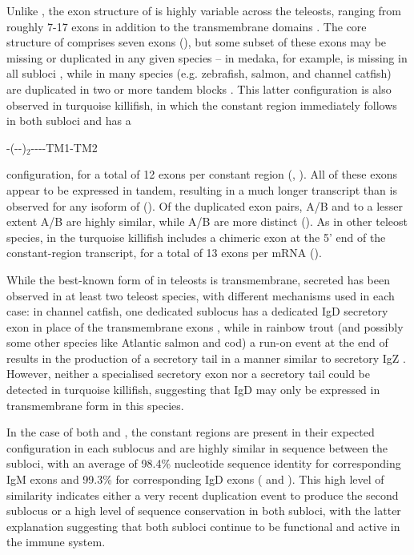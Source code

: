 		Unlike , the exon structure of  is highly variable across the teleosts, ranging from roughly 7-17 \cd{} exons in addition to the transmembrane domains \parencite{fillatreau2013astonishing}. The core structure of  comprises seven \cd{} exons (), but some subset of these exons may be missing or duplicated in any given species -- in medaka, for example,  is missing in all subloci \parencite{magadan2011medaka}, while in many species (e.g. zebrafish, salmon, and channel catfish)  are duplicated in two or more tandem blocks \parencite{fillatreau2013astonishing}. This latter configuration is also observed in turquoise killifish, in which the  constant region immediately follows  in both subloci and has a 

-(--)$_2$----TM1-TM2 

	\noindent configuration, for a total of 12 exons per  constant region (, ). All of these exons appear to be expressed in tandem, resulting in a much longer transcript than is observed for any isoform of  (). Of the duplicated exon pairs, A/B and to a lesser extent A/B are highly similar, while A/B are more distinct (). As in other teleost species,  in the turquoise killifish includes a chimeric  exon at the 5' end of the constant-region transcript, for a total of 13 exons per  mRNA ().

	While the best-known form of  in teleosts is transmembrane, secreted  has been observed in at least two teleost species, with different mechanisms used in each case: in channel catfish, one dedicated sublocus has a dedicated IgD secretory exon in place of the transmembrane exons \parencite{bengten2006catfish}, while in rainbow trout (and possibly some other species like Atlantic salmon and cod) a run-on event at the end of  results in the production of a secretory tail in a manner similar to secretory IgZ \parencite{ramirezgomez2012secretoryigd}. However, neither a specialised secretory exon nor a  secretory tail could be detected in turquoise killifish, suggesting that IgD may only be expressed in transmembrane form in this species.
	
	In the case of both  and , the constant regions are present in their expected configuration in each sublocus and are highly similar in sequence between the subloci, with an average of 98.4\% nucleotide sequence identity for corresponding IgM exons and 99.3\% for corresponding IgD exons ( and ). This high level of similarity indicates either a very recent duplication event to produce the second sublocus or a high level of sequence conservation in both subloci, with the latter explanation suggesting that both subloci continue to be functional and active in the immune system.

